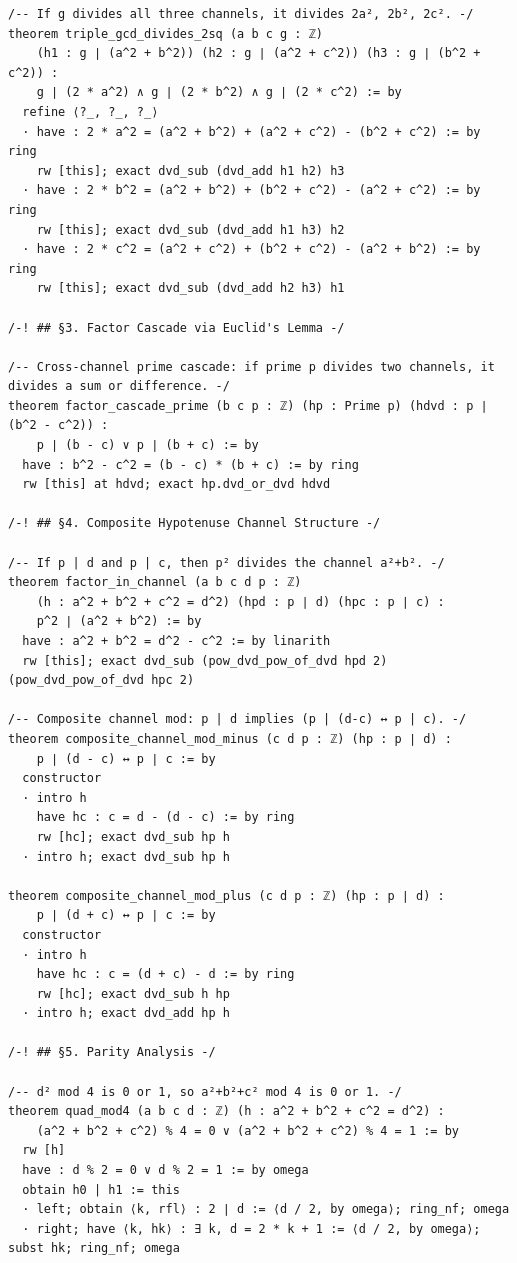 \documentclass[11pt,openany]{book}
\theoremstyle{definition}
\theoremstyle{plain}
\theoremstyle{remark}
\begin{document}
\begin{lstlisting}[style=lean]
/-- If g divides all three channels, it divides 2a², 2b², 2c². -/
theorem triple_gcd_divides_2sq (a b c g : ℤ)
    (h1 : g ∣ (a^2 + b^2)) (h2 : g ∣ (a^2 + c^2)) (h3 : g ∣ (b^2 + c^2)) :
    g ∣ (2 * a^2) ∧ g ∣ (2 * b^2) ∧ g ∣ (2 * c^2) := by
  refine ⟨?_, ?_, ?_⟩
  · have : 2 * a^2 = (a^2 + b^2) + (a^2 + c^2) - (b^2 + c^2) := by ring
    rw [this]; exact dvd_sub (dvd_add h1 h2) h3
  · have : 2 * b^2 = (a^2 + b^2) + (b^2 + c^2) - (a^2 + c^2) := by ring
    rw [this]; exact dvd_sub (dvd_add h1 h3) h2
  · have : 2 * c^2 = (a^2 + c^2) + (b^2 + c^2) - (a^2 + b^2) := by ring
    rw [this]; exact dvd_sub (dvd_add h2 h3) h1

/-! ## §3. Factor Cascade via Euclid's Lemma -/

/-- Cross-channel prime cascade: if prime p divides two channels, it divides a sum or difference. -/
theorem factor_cascade_prime (b c p : ℤ) (hp : Prime p) (hdvd : p ∣ (b^2 - c^2)) :
    p ∣ (b - c) ∨ p ∣ (b + c) := by
  have : b^2 - c^2 = (b - c) * (b + c) := by ring
  rw [this] at hdvd; exact hp.dvd_or_dvd hdvd

/-! ## §4. Composite Hypotenuse Channel Structure -/

/-- If p | d and p | c, then p² divides the channel a²+b². -/
theorem factor_in_channel (a b c d p : ℤ)
    (h : a^2 + b^2 + c^2 = d^2) (hpd : p ∣ d) (hpc : p ∣ c) :
    p^2 ∣ (a^2 + b^2) := by
  have : a^2 + b^2 = d^2 - c^2 := by linarith
  rw [this]; exact dvd_sub (pow_dvd_pow_of_dvd hpd 2) (pow_dvd_pow_of_dvd hpc 2)

/-- Composite channel mod: p | d implies (p | (d-c) ↔ p | c). -/
theorem composite_channel_mod_minus (c d p : ℤ) (hp : p ∣ d) :
    p ∣ (d - c) ↔ p ∣ c := by
  constructor
  · intro h
    have hc : c = d - (d - c) := by ring
    rw [hc]; exact dvd_sub hp h
  · intro h; exact dvd_sub hp h

theorem composite_channel_mod_plus (c d p : ℤ) (hp : p ∣ d) :
    p ∣ (d + c) ↔ p ∣ c := by
  constructor
  · intro h
    have hc : c = (d + c) - d := by ring
    rw [hc]; exact dvd_sub h hp
  · intro h; exact dvd_add hp h

/-! ## §5. Parity Analysis -/

/-- d² mod 4 is 0 or 1, so a²+b²+c² mod 4 is 0 or 1. -/
theorem quad_mod4 (a b c d : ℤ) (h : a^2 + b^2 + c^2 = d^2) :
    (a^2 + b^2 + c^2) % 4 = 0 ∨ (a^2 + b^2 + c^2) % 4 = 1 := by
  rw [h]
  have : d % 2 = 0 ∨ d % 2 = 1 := by omega
  obtain h0 | h1 := this
  · left; obtain ⟨k, rfl⟩ : 2 ∣ d := ⟨d / 2, by omega⟩; ring_nf; omega
  · right; have ⟨k, hk⟩ : ∃ k, d = 2 * k + 1 := ⟨d / 2, by omega⟩; subst hk; ring_nf; omega


\end{lstlisting}
\end{document}
